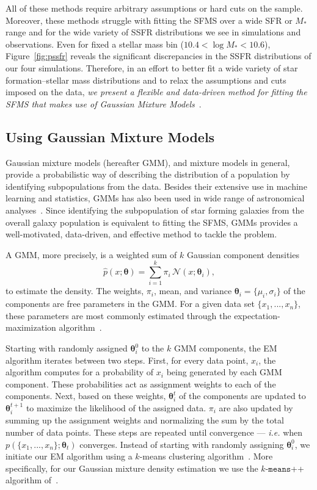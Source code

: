 \documentclass[preprint2,tighten]{aastex62}
\begin{document}
All of these methods require arbitrary assumptions or hard cuts on the 
sample. Moreover, these methods struggle with fitting the SFMS over a 
wide SFR or $M_*$ range and for the wide variety of SSFR distributions we see 
in simulations and observations. Even for fixed a stellar mass bin 
($10.4 < \log M_* < 10.6$), Figure~\ref{fig:pssfr} reveals the 
significant discrepancies in the SSFR distributions of our four simulations. 
Therefore, in an effort to better fit a wide variety of star formation--stellar
mass distributions and to relax the assumptions and cuts imposed on the data, 
\emph{we present a flexible and data-driven method for fitting the SFMS that 
makes use of Gaussian Mixture 
Models}~\citep[][]{Press:1992:NRC:148286, 9780471006268}. 

\subsection{Using Gaussian Mixture Models}
Gaussian mixture models (hereafter GMM), and mixture models in general, provide 
a probabilistic way of describing the distribution of a population by 
identifying subpopulations from the data. Besides their extensive use 
in machine learning and statistics, GMMs has also been used in wide range 
of astronomical analyses~\citep{bovy2011,lee2012,taylor2015}. 
Since identifying the subpopulation of star forming galaxies from the overall
galaxy population is equivalent to fitting the SFMS, GMMs provides a 
well-motivated, data-driven, and effective method to tackle the problem. 

A GMM, more precisely, is a weighted sum of $k$ Gaussian component densities 
\begin{equation} \label{eq:gmm}
\hat{p}(x;\bm{\theta}) = \sum\limits_{i=1}^{k} \pi_i \, \mathcal{N}(x; \bm{\theta}_i),
\end{equation}
to estimate the density. The weights, $\pi_i$, mean, and variance  
$\bm{\theta}_i=\{\mu_i, \sigma_i\}$ 
of the components are free parameters in the GMM. For a given data set 
$\{x_1, ..., x_n\}$, these parameters are most commonly estimated through
the expectation-maximization algorithm~\citep[EM;]{dempster1977,neal1998}. 

Starting with randomly assigned $\bm{\theta}_{i}^0$ to the $k$ GMM components, 
the EM algorithm iterates between two steps. First, for every data point, 
$x_i$, the algorithm computes for a probability of $x_i$ being generated by 
each GMM component. These probabilities act as assignment weights to each of
the components. Next, based on these weights, $\bm{\theta}_i^t$ of the components 
are updated to $\bm{\theta}_i^{t+1}$ to maximize the likelihood of the assigned 
data. $\pi_i$ are also updated by summing up the assignment weights and 
normalizing the sum by the total number of data points. These steps are 
repeated until convergence --- \emph{i.e.} when $p(\{x_1, ..., x_n\} ; \bm{\theta}_t)$ 
converges. Instead of starting with randomly assigning $\bm{\theta}_{i}^0$, 
we initiate our EM algorithm using a $k$-means clustering algorithm~\citep{lloyd1982}.
More specifically, for our Gaussian mixture density estimation we use 
the $k$-$\mathtt{means}$++ algorithm of~\cite{arthur2007}. 
\end{document}
